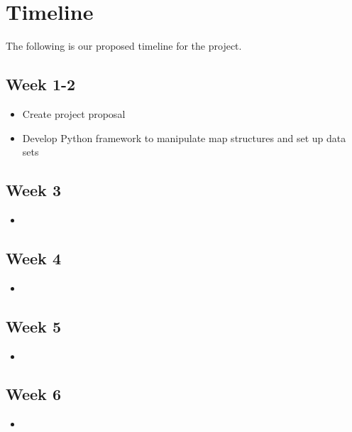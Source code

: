 \documentclass{article}
\numberwithin{equation}{section}
\theoremstyle{definition}
\begin{document}
\newpage
\section{Timeline}
The following is our proposed timeline for the project. 

\subsection*{Week 1-2}
\begin{itemize}[noitemsep]
    \item Create project proposal
    \item Develop Python framework to manipulate map structures and set up data sets
\end{itemize}


\subsection*{Week 3}
\begin{itemize}[noitemsep]
    \item 
\end{itemize}

\subsection*{Week 4}
\begin{itemize}[noitemsep]
    \item 
\end{itemize}

\subsection*{Week 5}
\begin{itemize}[noitemsep]
    \item 
\end{itemize}

\subsection*{Week 6}
\begin{itemize}[noitemsep]
    \item 
\end{itemize}
\end{document}
